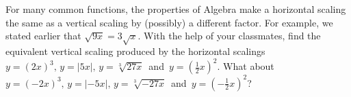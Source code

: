 {For many common functions, the properties of Algebra make a horizontal scaling the same as a vertical scaling by (possibly) a different factor.  For example, we stated earlier that $\sqrt{9x} = 3\sqrt{x}$.  With the help of your classmates, find the equivalent vertical scaling produced by the horizontal scalings $y = (2x)^{3}, \, y = |5x|, \, y = \sqrt[3]{27x} \, $ and $\, y = \left(\frac{1}{2} x\right)^{2}$.  What about $y = (-2x)^{3}, \, y = |-5x|, \, y = \sqrt[3]{-27x}\, $ and $\, y = \left(-\frac{1}{2} x\right)^{2}$?}
{}